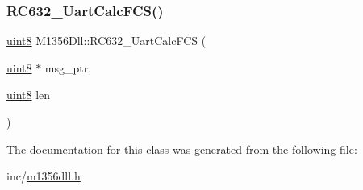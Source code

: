 \mbox{\label{class_m1356_dll_a048d48e3154a48258d25391b19de938c}} 
\subsubsection{\texorpdfstring{RC632\_UartCalcFCS()}{RC632\_UartCalcFCS()}}
{\footnotesize\ttfamily \mbox{\hyperlink{m1356dll_8h_adde6aaee8457bee49c2a92621fe22b79}{uint8}} M1356\+Dll\+::\+R\+C632\+\_\+\+Uart\+Calc\+F\+CS (\begin{DoxyParamCaption}\item[{\mbox{\hyperlink{m1356dll_8h_adde6aaee8457bee49c2a92621fe22b79}{uint8}} $\ast$}]{msg\+\_\+ptr,  }\item[{\mbox{\hyperlink{m1356dll_8h_adde6aaee8457bee49c2a92621fe22b79}{uint8}}}]{len }\end{DoxyParamCaption})}



The documentation for this class was generated from the following file\+:\begin{DoxyCompactItemize}
\item 
inc/\mbox{\hyperlink{m1356dll_8h}{m1356dll.\+h}}\end{DoxyCompactItemize}
